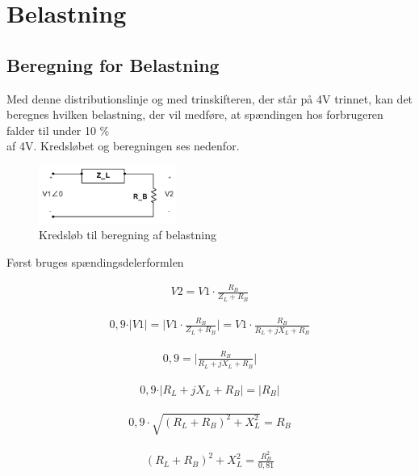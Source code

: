 
\section{Belastning}
\subsection{Beregning for Belastning}
Med denne distributionslinje og med trinskifteren, der står på 4V trinnet, kan det beregnes hvilken belastning, der vil medføre, at spændingen hos forbrugeren falder til under 10 \% \\ af 4V. Kredsløbet og beregningen ses nedenfor.

\begin{figure}[htbp] %
	\centering
	\includegraphics[width=0.4\textwidth]{Figure/Belastningberegning}
	\caption{Kredsløb til beregning af belastning}
	\label{fig:Belastningberegning}
\end{figure}

Først bruges spændingsdelerformlen

\begin{align}
	V2=V1\cdot\frac{R_B}{Z_L+R_B}
\end{align}

\begin{align}
	0,9\cdot\vert V1 \vert = \vert V1\cdot\frac{R_B}{Z_L+R_B} \vert = V1\cdot\frac{R_B}{R_L+jX_L+R_B}
\end{align}

\begin{align}
0,9= \vert \frac{R_B}{R_L+jX_L+R_B} \vert
\end{align}

\begin{align}
	0,9\cdot\vert R_L+jX_L+R_B \vert = \vert R_B \vert
\end{align}

\begin{align}
0,9\cdot\sqrt{(R_L+R_B)^2+X_L^2}=R_B
\end{align}

\begin{align}
(R_L+R_B)^2+X_L^2=\frac{R_B^2}{0,81}
\end{align}

